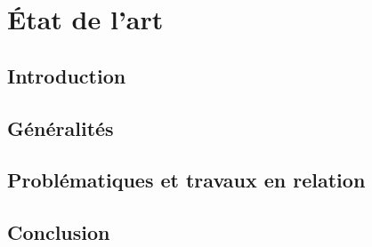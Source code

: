 \chapter{État de l'art}
\section{Introduction}
\section{Généralités}
\section{Problématiques et travaux en relation}


\section{Conclusion}